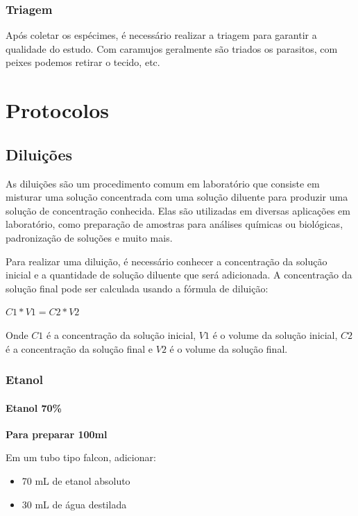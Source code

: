 \documentclass[
  letterpaper,
  DIV=11,
  numbers=noendperiod]{scrreprt}
\begin{document}
\hypertarget{triagem}{%
\section{Triagem}\label{triagem}}

Após coletar os espécimes, é necessário realizar a triagem para garantir
a qualidade do estudo. Com caramujos geralmente são triados os
parasitos, com peixes podemos retirar o tecido, etc.

\part{Protocolos}

\hypertarget{diluiuxe7uxf5es}{%
\chapter{Diluições}\label{diluiuxe7uxf5es}}

As diluições são um procedimento comum em laboratório que consiste em
misturar uma solução concentrada com uma solução diluente para produzir
uma solução de concentração conhecida. Elas são utilizadas em diversas
aplicações em laboratório, como preparação de amostras para análises
químicas ou biológicas, padronização de soluções e muito mais.

Para realizar uma diluição, é necessário conhecer a concentração da
solução inicial e a quantidade de solução diluente que será adicionada.
A concentração da solução final pode ser calculada usando a fórmula de
diluição:

\(C1 * V1 = C2 * V2\)

Onde \(C1\) é a concentração da solução inicial, \(V1\) é o volume da
solução inicial, \(C2\) é a concentração da solução final e \(V2\) é o
volume da solução final.

\hypertarget{etanol}{%
\section{Etanol}\label{etanol}}

\hypertarget{etanol-70}{%
\subsection{Etanol 70\%}\label{etanol-70}}

\textbf{Para preparar 100ml}

Em um tubo tipo falcon, adicionar:

\begin{itemize}
\item
  70 mL de etanol absoluto
\item
  30 mL de água destilada
\end{itemize}
\end{document}
